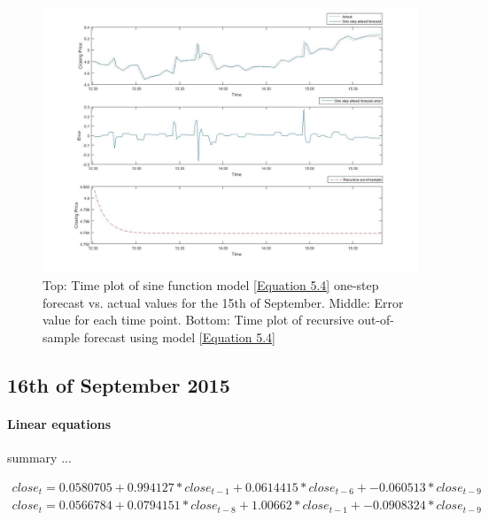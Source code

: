 \documentclass[13pt]{report}
\begin{document}
\begin{figure}[H]
\centering
\label{VWNonlinear15fig}
\includegraphics[width=\textwidth]{15nonlinear}
\caption{Top: Time plot of sine function model \ref{Equation 5.4} one-step forecast vs. actual values for the 15th of September. Middle: Error value for each time point. Bottom: Time plot of recursive out-of-sample forecast using model \ref{Equation 5.4}}
\end{figure}

\subsection{16th of September 2015}
\paragraph{Linear equations}\hfill \break
summary ...

\begin{equation}
\begin{align*}
close_{t} = 0.0580705 + 0.994127 * close_{t-1} + 0.0614415 * close_{t-6} + -0.060513 * close_{t-9}
\end{align*}
\label{Equation 5.5}
\end{equation}
\begin{equation}
\begin{align*}
close_{t} = 0.0566784 + 0.0794151 * close_{t-8} + 1.00662 * close_{t-1} + -0.0908324 * close_{t-9}
\end{align*}
\label{Equation 5.6}
\end{equation}
\end{document}
